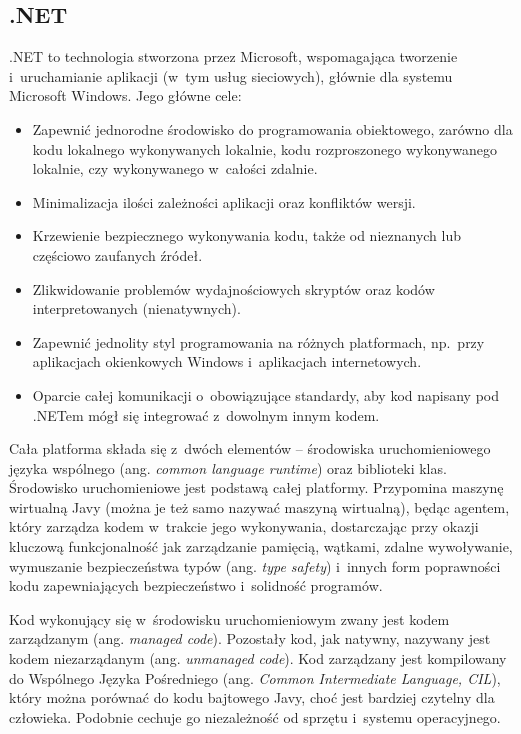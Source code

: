 \subsection{.NET}
.NET to technologia stworzona przez Microsoft, wspomagająca tworzenie i~uruchamianie aplikacji (w~tym usług sieciowych), głównie dla systemu Microsoft Windows\cite{dot-net-overview}. Jego główne cele:
\begin{itemize}
	\item Zapewnić jednorodne środowisko do programowania obiektowego, zarówno dla kodu lokalnego wykonywanych lokalnie, kodu rozproszonego wykonywanego lokalnie, czy wykonywanego w~całości zdalnie.
	\item Minimalizacja ilości zależności aplikacji oraz konfliktów wersji.
	\item Krzewienie bezpiecznego wykonywania kodu, także od nieznanych lub częściowo zaufanych źródeł.
	\item Zlikwidowanie problemów wydajnościowych skryptów oraz kodów interpretowanych (nienatywnych).
	\item Zapewnić jednolity styl programowania na różnych platformach, np.\ przy aplikacjach okienkowych Windows i~aplikacjach internetowych.
	\item Oparcie całej komunikacji o~obowiązujące standardy, aby kod napisany pod .NETem mógł się integrować z~dowolnym innym kodem.
\end{itemize}

Cała platforma składa się z~dwóch elementów -- środowiska uruchomieniowego języka wspólnego (ang. \emph{common language runtime}) oraz biblioteki klas. Środowisko uruchomieniowe jest podstawą całej platformy. Przypomina maszynę wirtualną Javy (można je też samo nazywać maszyną wirtualną), będąc agentem, który zarządza kodem w~trakcie jego wykonywania, dostarczając przy okazji kluczową funkcjonalność jak zarządzanie pamięcią, wątkami, zdalne wywoływanie, wymuszanie bezpieczeństwa typów (ang. \emph{type safety}) i~innych form poprawności kodu zapewniających bezpieczeństwo i~solidność programów.

Kod wykonujący się w~środowisku uruchomieniowym zwany jest kodem zarządzanym (ang. \emph{managed code}). Pozostały kod, jak natywny, nazywany jest kodem niezarządanym (ang. \emph{unmanaged code}). Kod zarządzany jest kompilowany do Wspólnego Języka Pośredniego\cite{cil} (ang. \emph{Common Intermediate Language, CIL}), który można porównać do kodu bajtowego Javy, choć jest bardziej czytelny dla człowieka. Podobnie cechuje go niezależność od sprzętu i~systemu operacyjnego.

